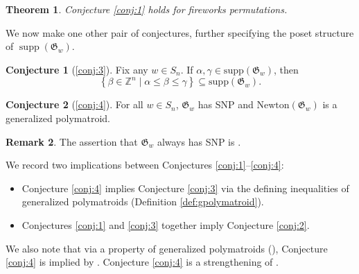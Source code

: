 \documentclass{amsart}
\newtheorem{theorem}{Theorem}[section]
\theoremstyle{definition}
\newtheorem{remark}[theorem]{Remark}
\theoremstyle{named}
\newtheorem*{namedconjecture}{Conjecture}
\newcommand{\avecom}[1]{\textcolor{red}{[$\star$A: #1\ $\star$]}}
\DeclareMathOperator{\supp}{supp}
\begin{document}
	
	\begin{theorem}
		\label{thm:fireworks}
		Conjecture \ref{conj:1} holds for fireworks permutations. 
	\end{theorem}
	
	We now make one other pair of conjectures, further specifying the poset structure of $\supp(\mathfrak{G}_w)$.
	
	\begin{namedconjecture}[\ref{conj:3}]
		Fix any $w\in S_n$. If $\alpha,\gamma\in\mathrm{supp}(\mathfrak{G}_w)$, then
		\[\left\{\beta\in \mathbb{Z}^n \mid \alpha\leq \beta\leq \gamma \right\} \subseteq \mathrm{supp}(\mathfrak{G}_w).  \]
	\end{namedconjecture}
	
	\begin{namedconjecture}[\ref{conj:4}]
		For all $w\in S_n$, $\mathfrak{G}_w$ has SNP and $\mathrm{Newton}(\mathfrak{G}_w)$ is a generalized polymatroid.
	\end{namedconjecture}
	
	\begin{remark}
		The assertion that $\mathfrak{G}_w$ always has SNP is \cite[Conjecture 5.5]{MTY}. 
	\end{remark}
	We record two implications between Conjectures \ref{conj:1}--\ref{conj:4}:
	\begin{itemize}
		\item Conjecture \ref{conj:4} implies Conjecture \ref{conj:3} via the defining inequalities of generalized polymatroids (Definition \ref{def:gpolymatroid}). 
		\item Conjectures \ref{conj:1} and \ref{conj:3} together imply Conjecture \ref{conj:2}.
	\end{itemize}
	We also note that via a property of generalized polymatroids (\cite[Theorem 14.2.5]{frank}), Conjecture \ref{conj:4} is implied by \cite[Conjecture 22]{schlorentzian}. Conjecture \ref{conj:4} is a strengthening of \cite[Conjecture 5.1]{genpermflows}.
	
 	
\end{document}
